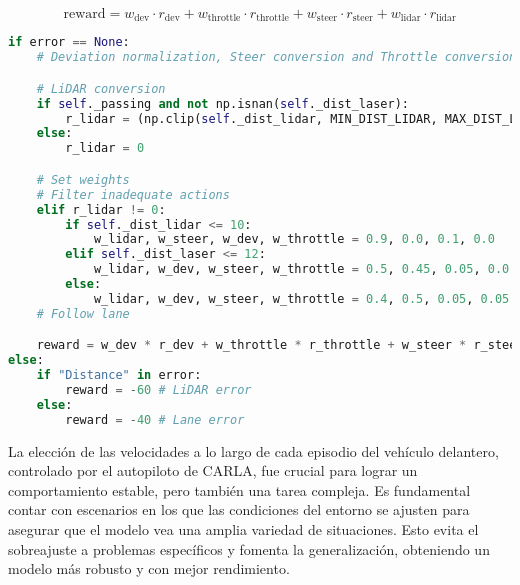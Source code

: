   \begin{myequation}[h]
    \begin{equation} 
      \text{reward} = w_{\text{dev}} \cdot r_{\text{dev}} + w_{\text{throttle}} \cdot r_{\text{throttle}} + w_{\text{steer}} \cdot r_{\text{steer}} + w_{\text{lidar}} \cdot r_{\text{lidar}}
    \end{equation} 
    \caption{Función de recompensa para el control adaptativo basado en \ac{PPO}.}
\label{eq:rew_ppo_adp}
  \end{myequation}

\begin{code}[H]
\begin{lstlisting}[language=Python]
if error == None:
    # Deviation normalization, Steer conversion and Throttle conversion

    # LiDAR conversion
    if self._passing and not np.isnan(self._dist_laser):
        r_lidar = (np.clip(self._dist_lidar, MIN_DIST_LIDAR, MAX_DIST_LIDAR) - MIN_DIST_LIDAR) / (MAX_DIST_LIDAR - MIN_DIST_LIDAR)       
    else:
        r_lidar = 0

    # Set weights
    # Filter inadequate actions
    elif r_lidar != 0:
        if self._dist_lidar <= 10:
            w_lidar, w_steer, w_dev, w_throttle = 0.9, 0.0, 0.1, 0.0
        elif self._dist_laser <= 12:
            w_lidar, w_dev, w_steer, w_throttle = 0.5, 0.45, 0.05, 0.0
        else:
            w_lidar, w_dev, w_steer, w_throttle = 0.4, 0.5, 0.05, 0.05
    # Follow lane

    reward = w_dev * r_dev + w_throttle * r_throttle + w_steer * r_steer + w_lidar * r_lidar
else:
    if "Distance" in error:
        reward = -60 # LiDAR error
    else:
        reward = -40 # Lane error
\end{lstlisting}
\caption[Función de recompensa respecto al \ac{LiDAR} para control de crucero adaptativo basado \ac{PPO}]{Función de recompensa respecto al \ac{LiDAR} para control de crucero adaptativo basado \ac{PPO}.}
\label{cod:rew_ppo_passing}
\end{code}

La elección de las velocidades a lo largo de cada episodio del vehículo delantero, controlado por el autopiloto de CARLA, fue crucial para lograr un comportamiento estable, pero también una tarea compleja. Es fundamental contar con escenarios en los que las condiciones del entorno se ajusten para asegurar que el modelo vea una amplia variedad de situaciones. Esto evita el sobreajuste a problemas específicos y fomenta la generalización, obteniendo un modelo más robusto y con mejor rendimiento.

